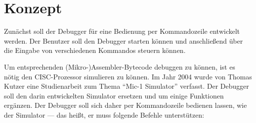 \chapter{Konzept}
Zunächst soll der Debugger für eine Bedienung per Kommandozeile entwickelt werden. Der Benutzer soll den Debugger starten können und anschließend über die Eingabe von verschiedenen Kommandos steuern können.

Um entsprechenden (Mikro-)Assembler-Bytecode debuggen zu können, ist es nötig den CISC-Prozessor simulieren zu können. Im Jahr 2004 wurde von Thomas Kutzer eine Studienarbeit zum Thema ``Mic-1 Simulator'' verfasst. Der Debugger soll den darin entwickelten Simulator ersetzen und um einige Funktionen ergänzen. Der Debugger soll sich daher per Kommandozeile bedienen lassen, wie der Simulator --- das heißt, er muss folgende Befehle unterstützen:

